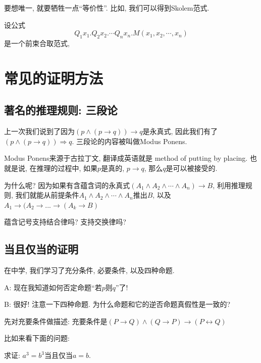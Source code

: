 要想唯一, 就要牺牲一点``等价性''. 比如, 我们可以得到Skolem范式. 

\begin{definition}
	设公式$$Q_1x_1. Q_2x_2. \cdots Q_nx_n. M(x_1,x_2,\cdots,x_n)$$是一个前束合取范式, 
	
\end{definition}

\section{常见的证明方法}

\subsection*{著名的推理规则: 三段论}

上一次我们说到了因为$(p\land (p\to q))\to q$是永真式, 因此我们有了$(p\land (p\to q))\Rightarrow q$. 三段论的内容被叫做Modus Ponens. 

Modus Ponens来源于古拉丁文, 翻译成英语就是 method of putting by placing. 也就是说, 在推理的过程中, 如果$p$是真的, $p\rightarrow q$, 那么$q$是可以被接受的. 

为什么呢? 因为如果有含蕴含词的永真式$(A_1\land A_2\land\cdots\land A_n)\to B$, 利用推理规则, 我们就能从前提条件$A_1\land A_2\land\cdots\land A_n$推出$B$, 以及$A_1 \rightarrow (A_2 \rightarrow ... \rightarrow (A_k\rightarrow B)$

\begin{bonus}
	蕴含记号支持结合律吗? 支持交换律吗? 
\end{bonus}

\subsection*{当且仅当的证明}

在中学, 我们学习了充分条件, 必要条件, 以及四种命题. 

\begin{dialogue}
	A: 现在我知道如何否定命题``若$p$则$q$''了!
	
	B: 很好! 注意一下四种命题. 为什么命题和它的逆否命题真假性是一致的?  
\end{dialogue}

先对充要条件做描述: 充要条件是$(P\rightarrow Q)\land (Q\rightarrow P)\rightarrow (P\leftrightarrow Q)$

比如来看下面的问题: 

\begin{prob}
	求证: $a^3=b^3$当且仅当$a=b$.
\end{prob}

